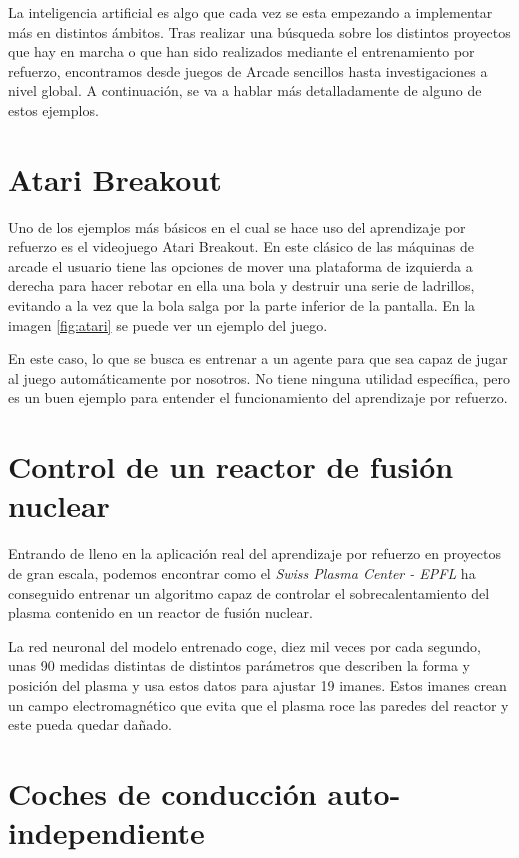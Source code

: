 
La inteligencia artificial es algo que cada vez se esta empezando a implementar más en distintos ámbitos. Tras realizar una búsqueda sobre los distintos proyectos que hay en marcha o que han sido realizados mediante el entrenamiento por refuerzo, encontramos desde juegos de Arcade sencillos hasta investigaciones a nivel global.
A continuación, se va a hablar más detalladamente de alguno de estos ejemplos.


\section{Atari Breakout}

Uno de los ejemplos más básicos en el cual se hace uso del aprendizaje por refuerzo es el videojuego Atari Breakout. En este clásico de las máquinas de arcade el usuario tiene las opciones de mover una plataforma de izquierda a derecha para hacer rebotar en ella una bola y destruir una serie de ladrillos, evitando a la vez que la bola salga por la parte inferior de la pantalla. En la imagen \ref{fig:atari} se puede ver un ejemplo del juego.

\label{fig:atari}

En este caso, lo que se busca es entrenar a un agente para que sea capaz de jugar al juego automáticamente por nosotros. No tiene ninguna utilidad específica, pero es un buen ejemplo para entender el funcionamiento del aprendizaje por refuerzo.


\section{Control de un reactor de fusión nuclear}

Entrando de lleno en la aplicación real del aprendizaje por refuerzo en proyectos de gran escala, podemos encontrar como el \textit{Swiss Plasma Center - EPFL}\cite{SPC} ha conseguido entrenar un algoritmo capaz de controlar el sobrecalentamiento del plasma contenido en un reactor de fusión nuclear.

La red neuronal del modelo entrenado coge, diez mil veces por cada segundo, unas 90 medidas distintas de distintos parámetros que describen la forma y posición del plasma y usa estos datos para ajustar 19 imanes. Estos imanes crean un campo electromagnético que evita que el plasma roce las paredes del reactor y este pueda quedar dañado.


\section{Coches de conducción auto-independiente}

